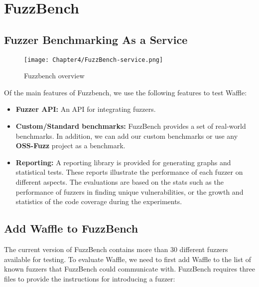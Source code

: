 \section{FuzzBench}
\label{sec:fuzzbench}

\subsection*{Fuzzer Benchmarking As a Service}

 \cite{metzman2020fuzzbench}

\begin{figure}[!t]
    \texttt{[image: Chapter4/FuzzBench-service.png]}
    \centering
    \caption{Fuzzbench overview}
    \label{fig:fuzz_bench}
\end{figure}

Of the main features of Fuzzbench, we use the following features to test Waffle:

\begin{itemize}
    \item \textbf{Fuzzer API:} An API for integrating fuzzers.
    \item \textbf{Custom/Standard benchmarks:} FuzzBench provides a set of real-world benchmarks. In addition, we can add our custom benchmarks or use any \textbf{OSS-Fuzz} project as a benchmark.
    \item \textbf{Reporting:} A reporting library is provided for generating graphs and statistical tests. These reports illustrate the performance of each fuzzer on different aspects. The evaluations are based on the stats such as the performance of fuzzers in finding unique vulnerabilities, or the growth and statistics of the code coverage during the experiments.
\end{itemize}

\subsection*{Add Waffle to FuzzBench}

The current version of FuzzBench contains more than 30 different fuzzers available for testing. To evaluate Waffle, we need to first add Waffle to the list of known fuzzers that FuzzBench could communicate with. FuzzBench requires three files to provide the instructions for introducing a fuzzer:

